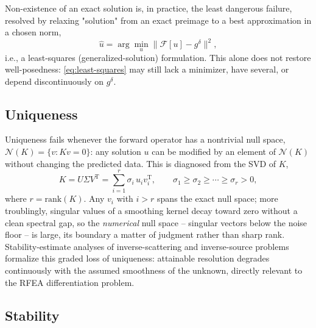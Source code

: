 Non-existence of an exact solution is, in practice, the least dangerous failure, resolved by relaxing "solution" from an exact preimage to a best approximation in a chosen norm,
\begin{equation}
\hat{u} = \arg\min_{u} \| \mathcal{F}[u] - g^{\delta} \|^{2},
\label{eq:least-squares}
\end{equation}
i.e., a least-squares (generalized-solution) formulation. This alone does not restore well-posedness: \cref{eq:least-squares} may still lack a minimizer, have several, or depend discontinuously on $g^{\delta}$.

\subsection{Uniqueness}

Uniqueness fails whenever the forward operator has a nontrivial null space, $\mathcal{N}(K) = \{v : Kv = 0\}$: any solution $u$ can be modified by an element of $\mathcal{N}(K)$ without changing the predicted data. This is diagnosed from the SVD of $K$,
\begin{equation}
K = U \Sigma V^{\mathrm{T}} = \sum_{i=1}^{r} \sigma_{i}\, u_{i} v_{i}^{\mathrm{T}}, \qquad \sigma_{1} \ge \sigma_{2} \ge \cdots \ge \sigma_{r} > 0,
\label{eq:svd}
\end{equation}
where $r = \mathrm{rank}(K)$. Any $v_i$ with $i > r$ spans the exact null space; more troublingly, singular values of a smoothing kernel decay toward zero without a clean spectral gap, so the \emph{numerical} null space -- singular vectors below the noise floor -- is large, its boundary a matter of judgment rather than sharp rank. Stability-estimate analyses of inverse-scattering and inverse-source problems formalize this graded loss of uniqueness: attainable resolution degrades continuously with the assumed smoothness of the unknown, directly relevant to the RFEA differentiation problem.

\subsection{Stability}

